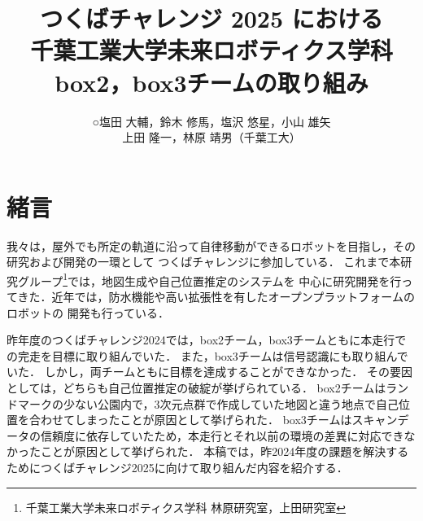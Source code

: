 \documentclass[uplatex, twocolumn, 9pt]{jsproceedings}
\title{つくばチャレンジ 2025 における\\千葉工業大学未来ロボティクス学科 box2，box3チームの取り組み}
\author{○塩田 大輔，鈴木 修馬，塩沢 悠星，小山 雄矢\\上田 隆一，林原 靖男（千葉工大）}
\affiliation{千葉工業大学未来ロボティクス学科 box2, box3チーム}
\begin{document}
\maketitle

\section{緒言}


我々は，屋外でも所定の軌道に沿って自律移動ができるロボットを目指し，その研究および開発の一環として
つくばチャレンジに参加している．
これまで本研究グループ\footnote{千葉工業大学未来ロボティクス学科 林原研究室，上田研究室}では，地図生成や自己位置推定のシステムを
中心に研究開発を行ってきた．近年では，防水機能や高い拡張性を有したオープンプラットフォームのロボットの
開発も行っている．

昨年度のつくばチャレンジ2024では，box2チーム，box3チームともに本走行での完走を目標に取り組んでいた． 
また，box3チームは信号認識にも取り組んでいた\cite{sympo2024}．
しかし，両チームともに目標を達成することができなかった．
その要因としては，どちらも自己位置推定の破綻が挙げられている．
box2チームはランドマークの少ない公園内で，3次元点群で作成していた地図と違う地点で自己位置を合わせてしまったことが原因として挙げられた． 
box3チームはスキャンデータの信頼度に依存していたため，本走行とそれ以前の環境の差異に対応できなかったことが原因として挙げられた．
本稿では，昨2024年度の課題を解決するためにつくばチャレンジ2025に向けて取り組んだ内容を紹介する．
% 
\end{document}
